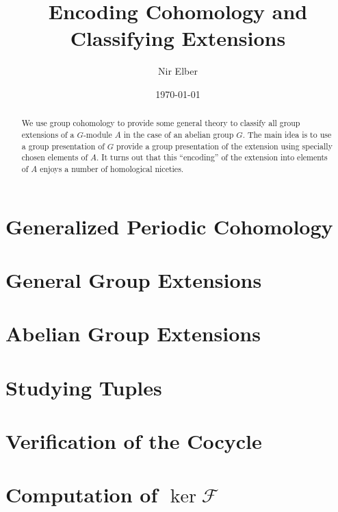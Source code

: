 \documentclass{article}
\title{Encoding Cohomology and Classifying Extensions}
\author{Nir Elber}
\date{\today}
\numberwithin{equation}{section}
\begin{document}
\maketitle

\begin{abstract}
	\noindent We use group cohomology to provide some general theory to classify all group extensions of a $ G$-module $A$ in the case of an abelian group $ G$. The main idea is to use a group presentation of $G$ provide a group presentation of the extension using specially chosen elements of $A$. It turns out that this ``encoding'' of the extension into elements of $A$ enjoys a number of homological niceties.
\end{abstract}

\setcounter{tocdepth}{4}
\tableofcontents

\section{Generalized Periodic Cohomology} \label{sec:crackpot}


\section{General Group Extensions} \label{sec:general}


\section{Abelian Group Extensions} \label{sec:abelian}


\section{Studying Tuples} \label{sec:tuplestudy}


\printbibliography[heading=bibintoc,title={References}]

\newpage
\appendix
\section{Verification of the Cocycle} \label{sec:verifycocycle}


\section{Computation of \texorpdfstring{$\ker\mathcal F$}{ker F}} \label{sec:havegensproof}

\end{document}
